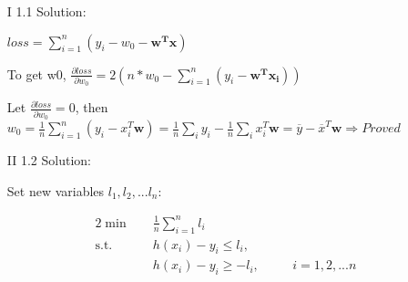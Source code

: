 \documentclass[12pt]{article}%
\begin{document}
\begin{itemize}

\item[I] 1.1 Solution:





$loss = \sum_{i=1}^{n} (y_i-w_0-\bm{w^{T}x})$

To get w0, $\frac{\partial loss}{\partial w_0} = 2 (n*w_0-\sum_{i=1}^{n} (y_i-\bm{w^{T}x_i}))$

Let $\frac{\partial loss}{\partial w_0} = 0$, then $ w_0 = \frac{1}{n} \sum_{i=1}^{n} (y_i-x_i^{T}\bm{w} ) = \frac{1}{n}\sum_{i}y_{i} - \frac{1}{n}\sum_{i}x_{i}^{T}\bm{w} = \overline{y} - \overline{x}^{T}\bm{w} \Longrightarrow Proved$

\item[II] 1.2 Solution:

Set new variables $l_1,l_2,...l_n$:

\begin{align}{2}

\min\quad &\frac{1}{n}\sum_{i=1}^{n}l_{i} &{}& \tag{LP1} \label{eqn - lp}\\

\mbox{s.t.}\quad

&h(x_i)-y_i \leq l_i, &\quad\\

&h(x_i)-y_i \geq -l_i, &{}& i  = 1,2,...n 

\end{align}


\end{itemize}
\end{document}

